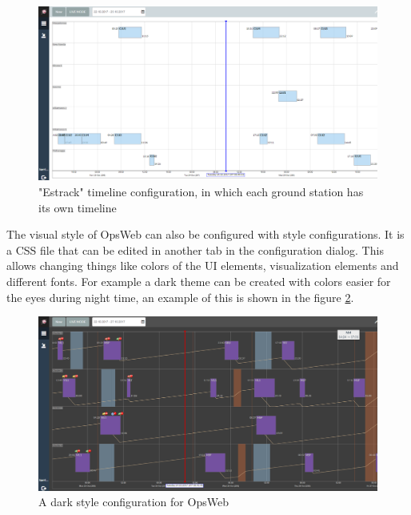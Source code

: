 \begin{figure}[ht]
  \begin{center}
    \includegraphics*[width=1\textwidth]{new_cw_estrack}
  \end{center}
  \caption{"Estrack" timeline configuration, in which each ground station has its own timeline}
  \label{fig:new_cw_estrack}
\end{figure}

The visual style of OpsWeb can also be configured with style configurations. It is a CSS file that can be edited in another tab in the configuration dialog. This allows changing things like colors of the UI elements, visualization elements and different fonts. For example a dark theme can be created with colors easier for the eyes during night time, an example of this is shown in the figure \ref{fig:new_cw_dark}.

\begin{figure}[ht]
  \begin{center}
    \includegraphics*[width=1\textwidth]{new_cw_dark}
  \end{center}
  \caption{A dark style configuration for OpsWeb}
  \label{fig:new_cw_dark}
\end{figure}

